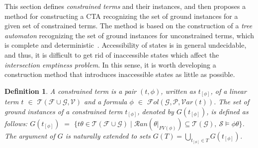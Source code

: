 \documentclass[copyright,creativecommons]{eptcs}
\newtheorem{definition}{Definition}
\newcommand{\cF}{\mathcal{F}}
\newcommand{\cG}{\mathcal{G}}
\newcommand{\cP}{\mathcal{P}}
\newcommand{\cS}{\mathcal{S}}
\newcommand{\cV}{\mathcal{V}}
\newcommand{\Var}{{\mathcal{V}ar}}
\newcommand{\FVar}{{\mathit{FV}}}
\newcommand{\Ran}{{\mathcal{R}an}}
\newcommand{\Terms}{{\mathcal{T}}}
\newcommand{\TwC}[2]{{#1}_{[#2]}}
\newcommand{\Fol}{{\mathcal{F}\!\mathit{ol}}}
\begin{document}
This section defines \emph{constrained terms} and their instances,
and then proposes a method for constructing a CTA recognizing the set of
ground instances for a given set of constrained terms. 
The method is based on the construction of a \emph{tree automaton}
recognizing the set of ground instances for unconstrained terms, which
is complete and deterministic~\cite[Exercise~1.9]{TATA}.
Accessibility of states is in general undecidable, and thus, it is
difficult to get rid of inaccessible states which affect
the \emph{intersection emptiness problem}. 
In this sense, it is worth developing a construction method that
introduces inaccessible states as little as possible. 
\begin{definition}\label{def:constrained-term}
A \emph{constrained term} is a pair $(t,\phi)$, written as
$\TwC{t}{\phi}$, of a linear term $t$ 
 $\in$ $\Terms(\cF\cup\cG,\cV)$ and a formula $\phi$ $\in$
 $\Fol(\cG,\cP,\Var(t))$. 
The set of \emph{ground instances} of a constrained term 
$\TwC{t}{\phi}$, denoted by $G(\TwC{t}{\phi})$, is defined
 as follows:
$G(\TwC{t}{\phi})$ $=$
$\{ t\theta \in \Terms(\cF\cup\cG) 
 \mid \Ran(\theta|_{\FVar(\phi)}) \subseteq \Terms(\cG),
 ~ \cS \models \phi\theta \}$.
The argument of $G$ is naturally extended to sets 
$ G(T) = \bigcup_{\TwC{t}{\phi} \in T} G(\TwC{t}{\phi})
$. \end{definition}
\end{document}
